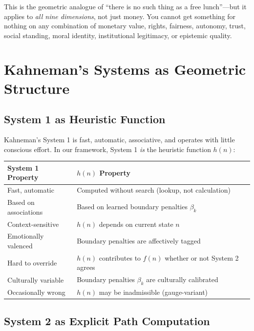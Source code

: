 \documentclass[12pt]{article}
\theoremstyle{definition}
\theoremstyle{remark}
\begin{document}
This is the geometric analogue of ``there is no such thing as a free lunch''---but it applies to \emph{all nine dimensions}, not just money.  You cannot get something for nothing on any combination of monetary value, rights, fairness, autonomy, trust, social standing, moral identity, institutional legitimacy, or epistemic quality.


\section{Kahneman's Systems as Geometric Structure}
\label{sec:kahneman}

\subsection{System 1 as Heuristic Function}

Kahneman's System 1 \cite{kahneman2011} is fast, automatic, associative, and operates with little conscious effort.  In our framework, System 1 \emph{is} the heuristic function $h(n)$:

\begin{center}
\begin{tabular}{ll}
\toprule
\textbf{System 1 Property} & \textbf{$h(n)$ Property} \\
\midrule
Fast, automatic & Computed without search (lookup, not calculation) \\
Based on associations & Based on learned boundary penalties $\beta_k$ \\
Context-sensitive & $h(n)$ depends on current state $n$ \\
Emotionally valenced & Boundary penalties are affectively tagged \\
Hard to override & $h(n)$ contributes to $f(n)$ whether or not System 2 agrees \\
Culturally variable & Boundary penalties $\beta_k$ are culturally calibrated \\
Occasionally wrong & $h(n)$ may be inadmissible (gauge-variant) \\
\bottomrule
\end{tabular}
\end{center}

\subsection{System 2 as Explicit Path Computation}
\end{document}

